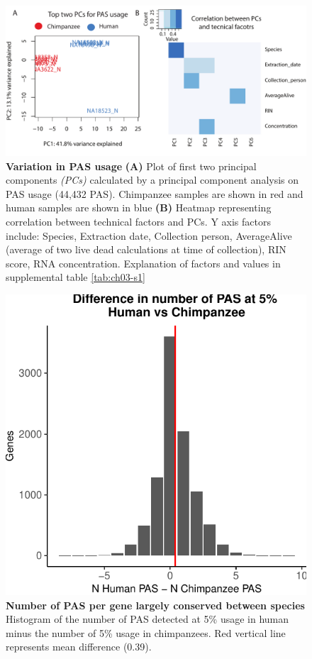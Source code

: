 \begin{figure}[!htb]
\centering
\includegraphics[width=5in]{img/ch03/Fig1-figSup4.pdf}
\caption[Variation in PAS usage]{\textbf{Variation in PAS usage} {\bf (A)}  Plot of first two principal components \emph{(PCs)} calculated by a principal component analysis on PAS usage (44,432 PAS). Chimpanzee samples are shown in red and human samples are shown in blue {\bf (B)}  Heatmap representing correlation between technical factors and PCs. Y axis factors include: Species, Extraction date, Collection person, AverageAlive (average of two live dead calculations at time of collection), RIN score, RNA concentration. Explanation of factors and values in supplemental table \ref{tab:ch03-s1}}
\label{fig:ch03-PCAthreeprime}
\end{figure}
\clearpage

\begin{figure}[!htb]
\centering
\includegraphics[width=5in]{img/ch03/Fig1-figSup6.pdf}
\caption[Number of PAS per gene largely conserved between species]{\textbf{Number of PAS per gene largely conserved between species} Histogram of the number of PAS detected at 5\% usage in human minus the number of 5\% usage in chimpanzees. Red vertical line represents mean difference (0.39).}
\label{fig:ch03-SpecPASnum}
\end{figure}
\clearpage


